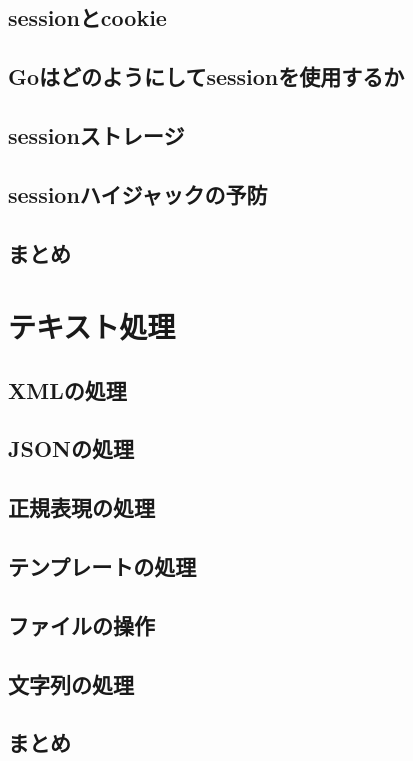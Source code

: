 \subsection{sessionとcookie}

\subsection{Goはどのようにしてsessionを使用するか}

\subsection{sessionストレージ}

\subsection{sessionハイジャックの予防}

\subsection{まとめ}


\section{テキスト処理}

\subsection{XMLの処理}

\subsection{JSONの処理}

\subsection{正規表現の処理}

\subsection{テンプレートの処理}

\subsection{ファイルの操作}

\subsection{文字列の処理}

\subsection{まとめ}


